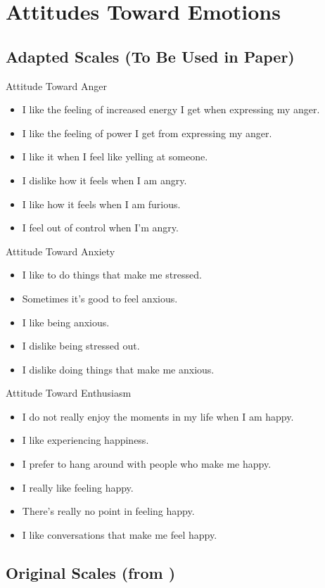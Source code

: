 \section{Attitudes Toward Emotions}

\subsection{Adapted Scales (To Be Used in Paper)}

Attitude Toward Anger
\begin{itemize}
  \item I like the feeling of increased energy I get when expressing my anger.
  \item I like the feeling of power I get from expressing my anger.
  \item I like it when I feel like yelling at someone.
  \item I dislike how it feels when I am angry.
  \item I like how it feels when I am furious.
  \item I feel out of control when I'm angry.
\end{itemize}

Attitude Toward Anxiety
\begin{itemize}
  \item I like to do things that make me stressed.
  \item Sometimes it's good to feel anxious.
  \item I like being anxious.
  \item I dislike being stressed out.
  \item I dislike doing things that make me anxious.
\end{itemize}

Attitude Toward Enthusiasm
\begin{itemize}
  \item I do not really enjoy the moments in my life when I am happy.
  \item I like experiencing happiness.
  \item I prefer to hang around with people who make me happy.
  \item I really like feeling happy.
  \item There's really no point in feeling happy.
  \item I like conversations that make me feel happy.
\end{itemize}

\subsection{Original Scales (from \citet{harmon2011attitudes})}

